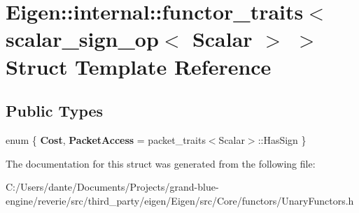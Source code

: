 \hypertarget{struct_eigen_1_1internal_1_1functor__traits_3_01scalar__sign__op_3_01_scalar_01_4_01_4}{}\section{Eigen\+::internal\+::functor\+\_\+traits$<$ scalar\+\_\+sign\+\_\+op$<$ Scalar $>$ $>$ Struct Template Reference}
\label{struct_eigen_1_1internal_1_1functor__traits_3_01scalar__sign__op_3_01_scalar_01_4_01_4}
\subsection*{Public Types}
\begin{DoxyCompactItemize}
\item 
\mbox{\label{struct_eigen_1_1internal_1_1functor__traits_3_01scalar__sign__op_3_01_scalar_01_4_01_4_ac046cbc470a694b0246899a069ba73ff}} 
enum \{ {\bfseries Cost}, 
{\bfseries Packet\+Access} = packet\+\_\+traits$<$Scalar$>$\+::Has\+Sign
 \}
\end{DoxyCompactItemize}


The documentation for this struct was generated from the following file\+:\begin{DoxyCompactItemize}
\item 
C\+:/\+Users/dante/\+Documents/\+Projects/grand-\/blue-\/engine/reverie/src/third\+\_\+party/eigen/\+Eigen/src/\+Core/functors/Unary\+Functors.\+h\end{DoxyCompactItemize}
